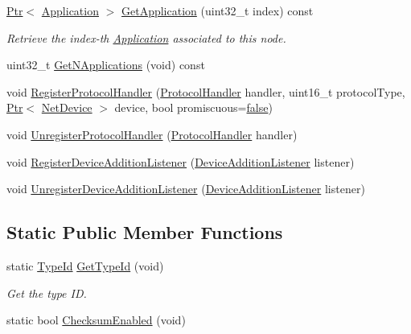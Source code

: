 \begin{DoxyCompactItemize}
\hyperlink{classns3_1_1Ptr}{Ptr}$<$ \hyperlink{classns3_1_1Application}{Application} $>$ \hyperlink{classns3_1_1Node_ad0ab54d76712398c0a8e25d9ac59ea41}{Get\+Application} (uint32\+\_\+t index) const 
\begin{DoxyCompactList}\small\item\em Retrieve the index-\/th \hyperlink{classns3_1_1Application}{Application} associated to this node. \end{DoxyCompactList}\item 
uint32\+\_\+t \hyperlink{classns3_1_1Node_a8deed92e0037f59e8a0901657d7c3060}{Get\+N\+Applications} (void) const 
\item 
void \hyperlink{classns3_1_1Node_af713f0e7ea5c49b4fa0b3613405c45fa}{Register\+Protocol\+Handler} (\hyperlink{classns3_1_1Node_a4ce20b9442f89703d242ce3a3fa3dbf2}{Protocol\+Handler} handler, uint16\+\_\+t protocol\+Type, \hyperlink{classns3_1_1Ptr}{Ptr}$<$ \hyperlink{classns3_1_1NetDevice}{Net\+Device} $>$ device, bool promiscuous=\hyperlink{lte__cqi__generation_8m_ab1bef239d413c4da139c4bac92cd657a}{false})
\item 
void \hyperlink{classns3_1_1Node_a059495453e24a8fc768daea91732984b}{Unregister\+Protocol\+Handler} (\hyperlink{classns3_1_1Node_a4ce20b9442f89703d242ce3a3fa3dbf2}{Protocol\+Handler} handler)
\item 
void \hyperlink{classns3_1_1Node_ad09c1f61887482454b52b399403e1edc}{Register\+Device\+Addition\+Listener} (\hyperlink{classns3_1_1Node_a29fd546b16195fd0ac8848ee107b5bc0}{Device\+Addition\+Listener} listener)
\item 
void \hyperlink{classns3_1_1Node_aed074cab79113369693f1712b956bf84}{Unregister\+Device\+Addition\+Listener} (\hyperlink{classns3_1_1Node_a29fd546b16195fd0ac8848ee107b5bc0}{Device\+Addition\+Listener} listener)
\end{DoxyCompactItemize}
\subsection*{Static Public Member Functions}
\begin{DoxyCompactItemize}
\item 
static \hyperlink{classns3_1_1TypeId}{Type\+Id} \hyperlink{classns3_1_1Node_ad2eb137f7a3ce60b9063c8118e970935}{Get\+Type\+Id} (void)
\begin{DoxyCompactList}\small\item\em Get the type ID. \end{DoxyCompactList}\item 
static bool \hyperlink{classns3_1_1Node_a0515bfe9a3aeb6605d657ba855699815}{Checksum\+Enabled} (void)
\end{DoxyCompactItemize}
